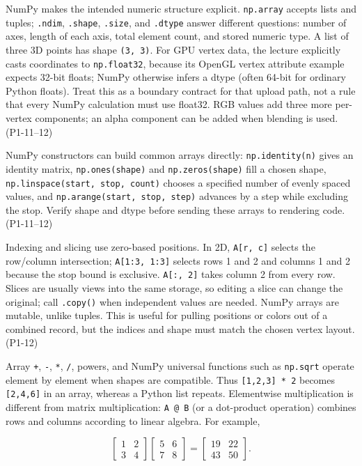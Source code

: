 NumPy makes the intended numeric structure explicit. \texttt{np.array} accepts lists and tuples; \texttt{.ndim}, \texttt{.shape}, \texttt{.size}, and \texttt{.dtype} answer different questions: number of axes, length of each axis, total element count, and stored numeric type. A list of three 3D points has shape \texttt{(3,\ 3)}. For GPU vertex data, the lecture explicitly casts coordinates to \texttt{np.float32}, because its OpenGL vertex attribute example expects 32-bit floats; NumPy otherwise infers a dtype (often 64-bit for ordinary Python floats). Treat this as a boundary contract for that upload path, not a rule that every NumPy calculation must use float32. RGB values add three more per-vertex components; an alpha component can be added when blending is used. (P1-11--12)

NumPy constructors can build common arrays directly: \texttt{np.identity(n)} gives an identity matrix, \texttt{np.ones(shape)} and \texttt{np.zeros(shape)} fill a chosen shape, \texttt{np.linspace(start,\ stop,\ count)} chooses a specified number of evenly spaced values, and \texttt{np.arange(start,\ stop,\ step)} advances by a step while excluding the stop. Verify shape and dtype before sending these arrays to rendering code. (P1-11--12)

Indexing and slicing use zero-based positions. In 2D, \texttt{A{[}r,\ c{]}} selects the row/column intersection; \texttt{A{[}1:3,\ 1:3{]}} selects rows 1 and 2 and columns 1 and 2 because the stop bound is exclusive. \texttt{A{[}:,\ 2{]}} takes column 2 from every row. Slices are usually views into the same storage, so editing a slice can change the original; call \texttt{.copy()} when independent values are needed. NumPy arrays are mutable, unlike tuples. This is useful for pulling positions or colors out of a combined record, but the indices and shape must match the chosen vertex layout. (P1-12)

Array \texttt{+}, \texttt{-}, \texttt{*}, \texttt{/}, powers, and NumPy universal functions such as \texttt{np.sqrt} operate element by element when shapes are compatible. Thus \texttt{{[}1,2,3{]}\ *\ 2} becomes \texttt{{[}2,4,6{]}} in an array, whereas a Python list repeats. Elementwise multiplication is different from matrix multiplication: \texttt{A\ @\ B} (or a dot-product operation) combines rows and columns according to linear algebra. For example,

\[
\begin{bmatrix}1&2\\3&4\end{bmatrix}
\begin{bmatrix}5&6\\7&8\end{bmatrix}
=
\begin{bmatrix}19&22\\43&50\end{bmatrix}.
\]

